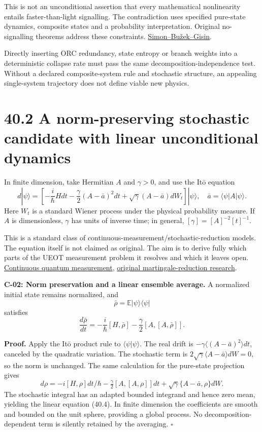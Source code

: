 \documentclass[
  11pt,
  oneside]{book}
\begin{document}
This is not an unconditional assertion that every mathematical
nonlinearity entails faster-than-light signalling. The contradiction
uses specified pure-state dynamics, composite states and a probability
interpretation. Original no-signalling theorems address these
constraints.
\href{https://arxiv.org/abs/quant-ph/0102125}{Simon--Bužek--Gisin}.

Directly inserting ORC redundancy, state entropy or branch weights into
a deterministic collapse rate must pass the same
decomposition-independence test. Without a declared composite-system
rule and stochastic structure, an appealing single-system trajectory
does not define viable new physics.

\section{40.2 A norm-preserving stochastic candidate with linear
unconditional dynamics}

In finite dimension, take Hermitian \(A\) and \(\gamma>0\), and use the
Itō equation \[
d|\psi\rangle=
\left[-\frac{i}{\hbar}Hdt
-\frac{\gamma}{2}(A-\bar a)^2dt
+\sqrt\gamma(A-\bar a)dW_t\right]|\psi\rangle,
\quad \bar a=\langle\psi|A|\psi\rangle.
\tag{40.3}
\] Here \(W_t\) is a standard Wiener process under the physical
probability measure. If \(A\) is dimensionless, \(\gamma\) has units of
inverse time; in general, \([\gamma]=[A]^{-2}[t]^{-1}\).

This is a standard class of continuous-measurement/stochastic-reduction
models. The equation itself is not claimed as original. The aim is to
derive fully which parts of the UEOT measurement problem it resolves and
which it leaves open. \href{https://arxiv.org/abs/1301.3626}{Continuous
quantum measurement},
\href{https://arxiv.org/abs/quant-ph/0107153}{original
martingale-reduction research}.

\label{c-02}{}

\textbf{C-02: Norm preservation and a linear ensemble average.} A
normalized initial state remains normalized, and \[
\bar\rho=\mathbb E|\psi\rangle\langle\psi|
\] satisfies \[
\frac{d\bar\rho}{dt}
=-\frac{i}{\hbar}[H,\bar\rho]
-\frac{\gamma}{2}[A,[A,\bar\rho]].
\tag{40.4}
\]

\textbf{Proof.} Apply the Itō product rule to
\(\langle\psi|\psi\rangle\). The real drift is
\(-\gamma\langle(A-\bar a)^2\rangle dt\), canceled by the quadratic
variation. The stochastic term is
\(2\sqrt\gamma\langle A-\bar a\rangle dW=0\), so the norm is unchanged.
The same calculation for the pure-state projection gives \[
d\rho=-i[H,\rho]dt/\hbar-\tfrac\gamma2[A,[A,\rho]]dt
+\sqrt\gamma\{A-\bar a,\rho\}dW.
\] The stochastic integral has an adapted bounded integrand and hence
zero mean, yielding the linear equation (40.4). In finite dimension the
coefficients are smooth and bounded on the unit sphere, providing a
global process. No decomposition-dependent term is silently retained by
the averaging. \(\square\)
\end{document}

